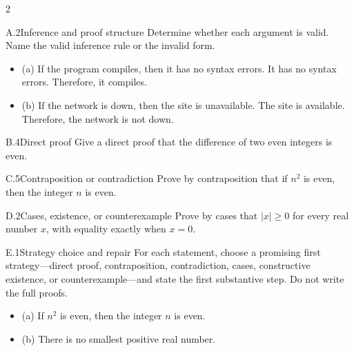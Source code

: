 \documentclass[9pt]{extarticle}
\begin{document}
\begin{multicols}{2}
\begin{CoreProblem}{A.2}{Inference and proof structure}
Determine whether each argument is valid. Name the valid inference rule or the invalid form.
\begin{itemize}
  \item (a) If the program compiles, then it has no syntax errors. It has no syntax errors. Therefore, it compiles.
  \item (b) If the network is down, then the site is unavailable. The site is
        available. Therefore, the network is not down.
\end{itemize}
\end{CoreProblem}
\begin{CoreProblem}{B.4}{Direct proof}
Give a direct proof that the difference of two even integers is even.
\end{CoreProblem}
\begin{CoreProblem}{C.5}{Contraposition or contradiction}
Prove by contraposition that if $n^2$ is even, then the integer $n$ is even.
\end{CoreProblem}
\columnbreak
\begin{CoreProblem}{D.2}{Cases, existence, or counterexample}
Prove by cases that $|x|\ge 0$ for every real number $x$, with equality exactly when $x=0$.
\end{CoreProblem}
\begin{CoreProblem}{E.1}{Strategy choice and repair}
For each statement, choose a promising first strategy---direct proof,
contraposition, contradiction, cases, constructive existence, or
counterexample---and state the first substantive step. Do not write the full
proofs.
\begin{itemize}
  \item (a) If $n^2$ is even, then the integer $n$ is even.
  \item (b) There is no smallest positive real number.
\end{itemize}
\end{CoreProblem}
\end{multicols}
\CoreWorkArea
\FormBreak
{}
\end{document}
